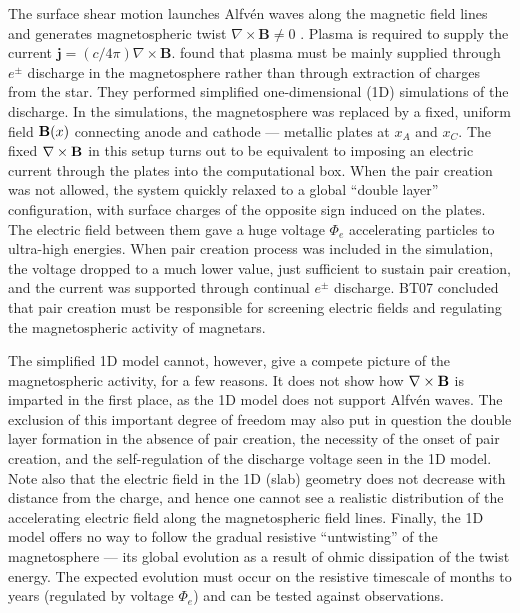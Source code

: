 The surface shear motion launches Alfv\'en waves along the magnetic field lines and
generates magnetospheric twist $\nabla\times \mathbf{B} \neq 0$
\citetext{\citealp{thompson_electrodynamics_2002}; \citealp{parfrey_dynamics_2013},
  hereafter PBH13}.
Plasma is required to supply the current $\mathbf{j} = (c/4\pi)\nabla\times \mathbf{B}$.
\citet[hereafter BT07]{beloborodov_corona_2007} found that plasma must be mainly
supplied through $e^\pm$ discharge in the magnetosphere rather than through
extraction of charges from the star. They performed simplified one-dimensional
(1D) simulations of the discharge. In the simulations, the magnetosphere was
replaced by a fixed, uniform field ${\mathbf B}(x)$ connecting anode and cathode ---
metallic plates at $x_A$ and $x_C$. The fixed $\nabla\times{\mathbf B}$ in this setup
turns out to be equivalent to imposing an electric current through the plates
into the computational box. When the pair creation was not allowed, the system
quickly relaxed to a global ``double layer'' configuration, with surface charges
of the opposite sign induced on the plates. The electric field between them gave
a huge voltage $\Phi_e$ accelerating particles to ultra-high energies. When pair
creation process was included in the simulation, the voltage dropped to a much
lower value, just sufficient to sustain pair creation, and the current was
supported through continual $e^\pm$ discharge. BT07 concluded that pair creation
must be responsible for screening electric fields and regulating the
magnetospheric activity of magnetars.

The simplified 1D model cannot, however, give a compete picture of the
magnetospheric activity, for a few reasons. It does not show how
$\nabla\times{\mathbf B}$ is imparted in the first place, as the 1D model does not
support Alfv\'en waves. The exclusion of this important degree of freedom may
also put in question the double layer formation in the absence of pair creation,
the necessity of the onset of pair creation, and the self-regulation of the
discharge voltage seen in the 1D model. Note also that the electric field in the
1D (slab) geometry does not decrease with distance from the charge, and hence
one cannot see a realistic distribution of the accelerating electric field along
the magnetospheric field lines. Finally, the 1D model offers no way to follow
the gradual resistive ``untwisting'' of the magnetosphere --- its global
evolution as a result of ohmic dissipation of the twist energy. The expected
evolution must occur on the resistive timescale of months to years (regulated by
voltage $\Phi_e$) and can be tested against observations.

